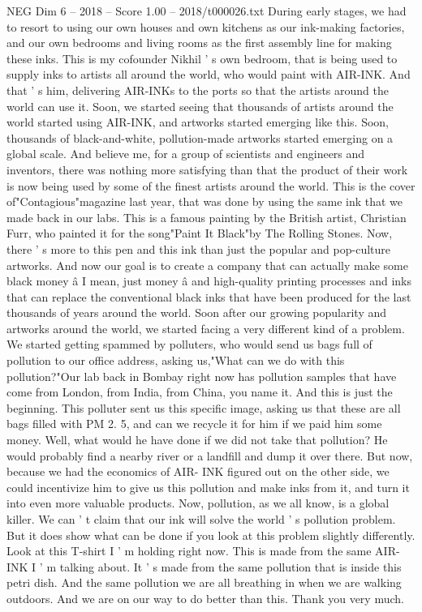 \begin{textsample}{NEG Dim 6 – 2018 – Score 1.00 – 2018/t000026.txt}
During early stages, we had to resort to using our own houses and own kitchens as our ink-making factories, and our own bedrooms and living rooms as the first assembly line for making these inks.
This is my cofounder Nikhil ' s own bedroom, that is being used to supply inks to artists all around the world, who would paint with AIR-INK.
And that ' s him, delivering AIR-INKs to the ports so that the artists around the world can use it.
Soon, we started seeing that thousands of artists around the world started using AIR-INK, and artworks started emerging like this.
Soon, thousands of black-and-white, pollution-made artworks started emerging on a global scale.
And believe me, for a group of scientists and engineers and inventors, there was nothing more satisfying than that the product of their work is now being used by some of the finest artists around the world.
This is the cover of"Contagious"magazine last year, that was done by using the same ink that we made back in our labs.
This is a famous painting by the British artist, Christian Furr, who painted it for the song"Paint It Black"by The Rolling Stones.
Now, there ' s more to this pen and this ink than just the popular and pop-culture artworks.
And now our goal is to create a company that can actually make some black money â I mean, just money â and high-quality printing processes and inks that can replace the conventional black inks that have been produced for the last thousands of years around the world.
Soon after our growing popularity and artworks around the world, we started facing a very different kind of a problem.
We started getting spammed by polluters, who would send us bags full of pollution to our office address, asking us,"What can we do with this pollution?"Our lab back in Bombay right now has pollution samples that have come from London, from India, from China, you name it.
And this is just the beginning.
This polluter sent us this specific image, asking us that these are all bags filled with PM 2. 5, and can we recycle it for him if we paid him some money.
Well, what would he have done if we did not take that pollution?
He would probably find a nearby river or a landfill and dump it over there.
But now, because we had the economics of AIR- INK figured out on the other side, we could incentivize him to give us this pollution and make inks from it, and turn it into even more valuable products.
Now, pollution, as we all know, is a global killer.
We can ' t claim that our ink will solve the world ' s pollution problem.
But it does show what can be done if you look at this problem slightly differently.
Look at this T-shirt I ' m holding right now.
This is made from the same AIR-INK I ' m talking about.
It ' s made from the same pollution that is inside this petri dish.
And the same pollution we are all breathing in when we are walking outdoors.
And we are on our way to do better than this.
Thank you very much.

\end{textsample}

